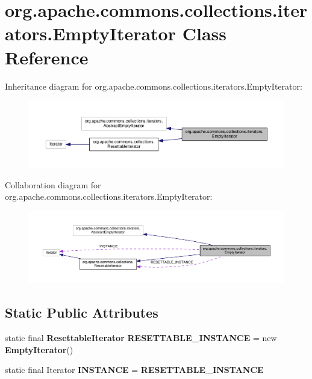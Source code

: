 \section{org.\-apache.\-commons.\-collections.\-iterators.\-Empty\-Iterator Class Reference}
\label{classorg_1_1apache_1_1commons_1_1collections_1_1iterators_1_1_empty_iterator}


Inheritance diagram for org.\-apache.\-commons.\-collections.\-iterators.\-Empty\-Iterator\-:
\nopagebreak
\begin{figure}[H]
\begin{center}
\leavevmode
\includegraphics[width=350pt]{classorg_1_1apache_1_1commons_1_1collections_1_1iterators_1_1_empty_iterator__inherit__graph}
\end{center}
\end{figure}


Collaboration diagram for org.\-apache.\-commons.\-collections.\-iterators.\-Empty\-Iterator\-:
\nopagebreak
\begin{figure}[H]
\begin{center}
\leavevmode
\includegraphics[width=350pt]{classorg_1_1apache_1_1commons_1_1collections_1_1iterators_1_1_empty_iterator__coll__graph}
\end{center}
\end{figure}
\subsection*{Static Public Attributes}
\begin{DoxyCompactItemize}
\item 
static final {\bf Resettable\-Iterator} {\bf R\-E\-S\-E\-T\-T\-A\-B\-L\-E\-\_\-\-I\-N\-S\-T\-A\-N\-C\-E} = new {\bf Empty\-Iterator}()
\item 
static final Iterator {\bf I\-N\-S\-T\-A\-N\-C\-E} = {\bf R\-E\-S\-E\-T\-T\-A\-B\-L\-E\-\_\-\-I\-N\-S\-T\-A\-N\-C\-E}
\end{DoxyCompactItemize}
